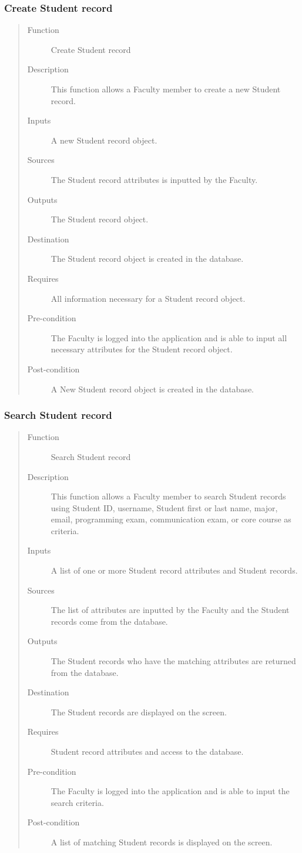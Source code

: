 \subsubsection{Create Student record} 
\begin{quote} %
\begin{description}
\item[Function]
   Create Student record
\item[Description]
   This function allows a Faculty member to create a new Student record.
\item[Inputs]
   A new Student record object.
\item[Sources]
   The Student record attributes is inputted by the Faculty.
\item[Outputs]
   The Student record object.
\item[Destination]
   The Student record object is created in the database.
\item[Requires]
   All information necessary for a Student record object.
\item[Pre-condition]
   The Faculty is logged into the application and is able to input all necessary
   attributes for the Student record object.
\item[Post-condition]
   A New Student record object is created in the database.
\end{description}
\end{quote} %

\subsubsection{Search Student record} 
\begin{quote} %
\begin{description}
\item[Function]
   Search Student record
\item[Description]
   This function allows a Faculty member to search Student records using
   Student ID, username, Student first or last name, major, email, programming
   exam, communication exam, or core course as criteria.
\item[Inputs]
   A list of one or more Student record attributes and Student records.
\item[Sources]
   The list of attributes are inputted by the Faculty and the Student records
   come from the database.
\item[Outputs]
   The Student records who have the matching attributes are returned from the
   database.
\item[Destination]
   The Student records are displayed on the screen.
\item[Requires]
   Student record attributes and access to the database.
\item[Pre-condition]
   The Faculty is logged into the application and is able to input the search
   criteria.
\item[Post-condition]
   A list of matching Student records is displayed on the screen.
\end{description}
\end{quote} %

